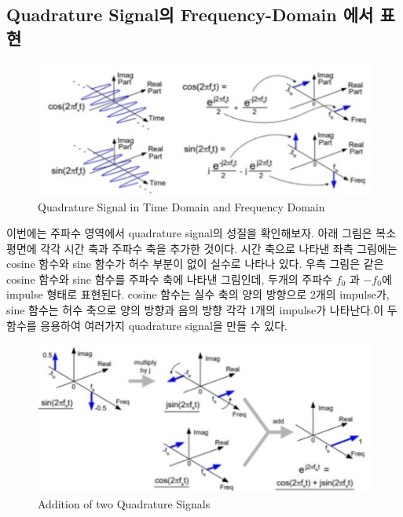 \subsection{Quadrature Signal의 Frequency-Domain 에서 표현}
    \vspace{-4mm}  
    \begin{figure}[!h]\centering
		\includegraphics[width=.7\textwidth]{image/week02/2-2-1.png}
		\caption{\small Quadrature Signal in Time Domain and Frequency Domain}
		\vspace{-10pt}
    \end{figure}    
\clearpage
    이번에는 주파수 영역에서 quadrature signal의 성질을 확인해보자. 아래 그림은 복소평면에 각각 시간 축과 주파수 축을 추가한 것이다.
    시간 축으로 나타낸 좌측 그림에는 cosine 함수와 sine 함수가 허수 부분이 없이 실수로 나타나 있다. 우측 그림은 같은 cosine 함수와 sine 함수를 주파수 축에 나타낸 그림인데, 두개의 주파수 $f_0$ 과 $-f_0$에 impulse 형태로 표현된다. cosine 함수는 실수 축의 양의 방향으로 2개의 impulse가, sine 함수는 허수 축으로 양의 방향과 음의 방향 각각 1개의 impulse가 나타난다.이 두 함수를 응용하여 여러가지 quadrature signal을 만들 수 있다. \\
    \vspace{-4mm}  
    \begin{figure}[!h]\centering
		\includegraphics[width=.7\textwidth]{image/week02/2-2-2.png}
		\caption{\small Addition of two Quadrature Signals}
		\vspace{-10pt}
    \end{figure}
    
